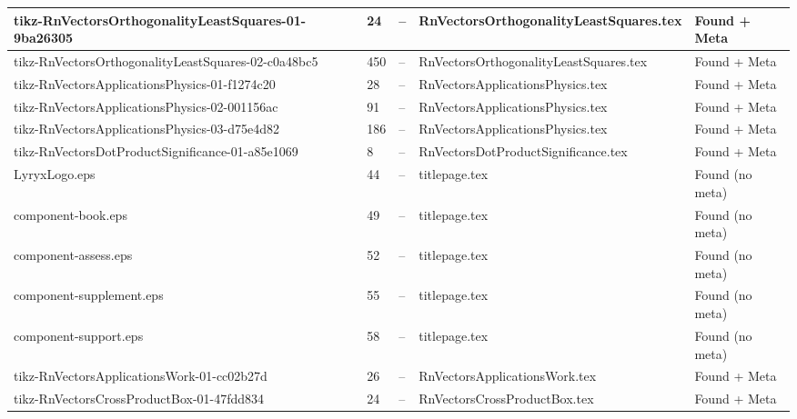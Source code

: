 \documentclass[11pt]{article}
\begin{document}
\begin{longtable}{|p{3.5cm}|p{1.5cm}|p{1cm}|p{4cm}|p{2cm}|}
tikz-RnVectorsOrthogonalityLeastSquares-01-9ba26305 & 24 & -- & RnVectorsOrthogonalityLeastSquares.tex & \textcolor{found}{Found + Meta} \\
\hline

tikz-RnVectorsOrthogonalityLeastSquares-02-c0a48bc5 & 450 & -- & RnVectorsOrthogonalityLeastSquares.tex & \textcolor{found}{Found + Meta} \\
\hline

tikz-RnVectorsApplicationsPhysics-01-f1274c20 & 28 & -- & RnVectorsApplicationsPhysics.tex & \textcolor{found}{Found + Meta} \\
\hline

tikz-RnVectorsApplicationsPhysics-02-001156ac & 91 & -- & RnVectorsApplicationsPhysics.tex & \textcolor{found}{Found + Meta} \\
\hline

tikz-RnVectorsApplicationsPhysics-03-d75e4d82 & 186 & -- & RnVectorsApplicationsPhysics.tex & \textcolor{found}{Found + Meta} \\
\hline

tikz-RnVectorsDotProductSignificance-01-a85e1069 & 8 & -- & RnVectorsDotProductSignificance.tex & \textcolor{found}{Found + Meta} \\
\hline

LyryxLogo.eps & 44 & -- & titlepage.tex & \textcolor{warning}{Found (no meta)} \\
\hline

component-book.eps & 49 & -- & titlepage.tex & \textcolor{warning}{Found (no meta)} \\
\hline

component-assess.eps & 52 & -- & titlepage.tex & \textcolor{warning}{Found (no meta)} \\
\hline

component-supplement.eps & 55 & -- & titlepage.tex & \textcolor{warning}{Found (no meta)} \\
\hline

component-support.eps & 58 & -- & titlepage.tex & \textcolor{warning}{Found (no meta)} \\
\hline

tikz-RnVectorsApplicationsWork-01-cc02b27d & 26 & -- & RnVectorsApplicationsWork.tex & \textcolor{found}{Found + Meta} \\
\hline

tikz-RnVectorsCrossProductBox-01-47fdd834 & 24 & -- & RnVectorsCrossProductBox.tex & \textcolor{found}{Found + Meta} \\
\hline


\end{longtable}
\end{document}

